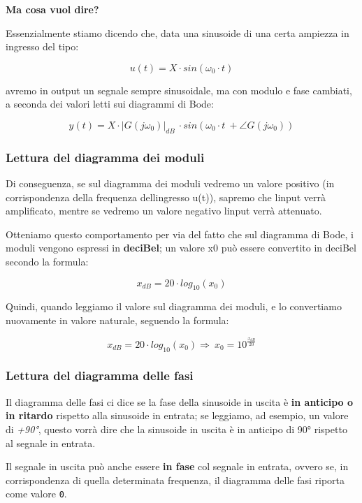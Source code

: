\documentclass[
]{article}
\begin{document}
\textbf{Ma cosa vuol dire?}

Essenzialmente stiamo dicendo che, data una sinusoide di una certa
ampiezza in ingresso del tipo:

\[u(t) = X \cdot sin(\omega_{0} \cdot t)\]

avremo in output un segnale sempre sinusoidale, ma con modulo e fase
cambiati, a seconda dei valori letti sui diagrammi di Bode:

\[y(t) = X \cdot |G(j\omega_{0})|_{dB} \ \cdot sin(\omega_{0} \cdot t \ + \angle{G(j\omega_{0})})\]

\hypertarget{lettura-del-diagramma-dei-moduli}{%
\subsubsection{Lettura del diagramma dei
moduli}\label{lettura-del-diagramma-dei-moduli}}

Di conseguenza, se sul diagramma dei moduli vedremo un valore positivo
(in corrispondenza della frequenza dell\textquotesingle ingresso u(t)),
sapremo che l\textquotesingle input verrà amplificato, mentre se vedremo
un valore negativo l\textquotesingle input verrà attenuato.

Otteniamo questo comportamento per via del fatto che sul diagramma di
Bode, i moduli vengono espressi in \textbf{deciBel}; un valore x0 può
essere convertito in deciBel secondo la formula:

\[x_{dB} = 20 \cdot log_{10}(x_{0})\]

Quindi, quando leggiamo il valore sul diagramma dei moduli, e lo
convertiamo nuovamente in valore naturale, seguendo la formula:

\[x_{dB} = 20 \cdot log_{10}(x_{0}) \Longrightarrow \ x_{0} = 10^{\frac{x_{dB}}{20}}\]

\hypertarget{lettura-del-diagramma-delle-fasi}{%
\subsubsection{Lettura del diagramma delle
fasi}\label{lettura-del-diagramma-delle-fasi}}

Il diagramma delle fasi ci dice se la fase della sinusoide in uscita è
\textbf{in anticipo o in ritardo} rispetto alla sinusoide in entrata; se
leggiamo, ad esempio, un valore di \emph{+90°}, questo vorrà dire che la
sinusoide in uscita è in anticipo di 90° rispetto al segnale in entrata.

Il segnale in uscita può anche essere \textbf{in fase} col segnale in
entrata, ovvero se, in corrispondenza di quella determinata frequenza,
il diagramma delle fasi riporta come valore \texttt{0}.
\end{document}
